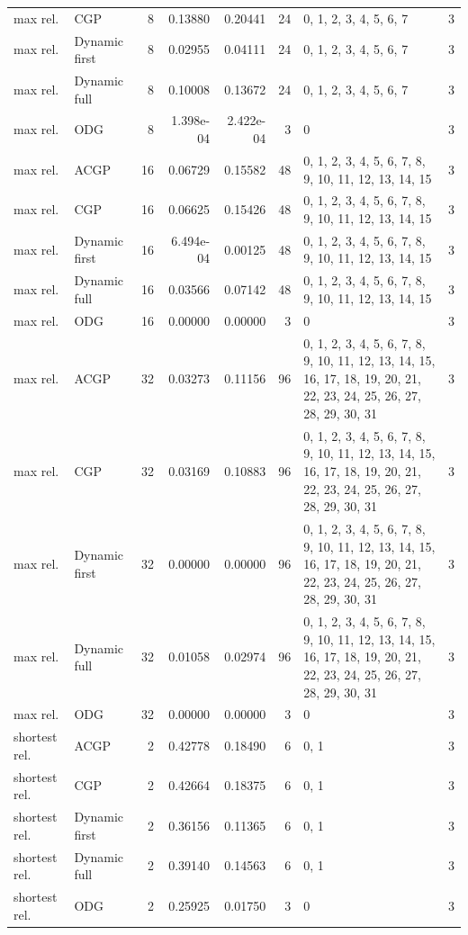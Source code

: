 \documentclass[10pt,a4paper]{article}
\begin{document}
\begin{longtable}{@{}p{23mm}p{29mm}rrrrp{36mm}r@{}}
max rel. & CGP & 8 & 0.13880 & 0.20441 & 24 & 0, 1, 2, 3, 4, 5, 6, 7 & 3 \\
max rel. & Dynamic first & 8 & 0.02955 & 0.04111 & 24 & 0, 1, 2, 3, 4, 5, 6, 7 & 3 \\
max rel. & Dynamic full & 8 & 0.10008 & 0.13672 & 24 & 0, 1, 2, 3, 4, 5, 6, 7 & 3 \\
max rel. & ODG & 8 & 1.398e-04 & 2.422e-04 & 3 & 0 & 3 \\
max rel. & ACGP & 16 & 0.06729 & 0.15582 & 48 & 0, 1, 2, 3, 4, 5, 6, 7, 8, 9, 10, 11, 12, 13, 14, 15 & 3 \\
max rel. & CGP & 16 & 0.06625 & 0.15426 & 48 & 0, 1, 2, 3, 4, 5, 6, 7, 8, 9, 10, 11, 12, 13, 14, 15 & 3 \\
max rel. & Dynamic first & 16 & 6.494e-04 & 0.00125 & 48 & 0, 1, 2, 3, 4, 5, 6, 7, 8, 9, 10, 11, 12, 13, 14, 15 & 3 \\
max rel. & Dynamic full & 16 & 0.03566 & 0.07142 & 48 & 0, 1, 2, 3, 4, 5, 6, 7, 8, 9, 10, 11, 12, 13, 14, 15 & 3 \\
max rel. & ODG & 16 & 0.00000 & 0.00000 & 3 & 0 & 3 \\
max rel. & ACGP & 32 & 0.03273 & 0.11156 & 96 & 0, 1, 2, 3, 4, 5, 6, 7, 8, 9, 10, 11, 12, 13, 14, 15, 16, 17, 18, 19, 20, 21, 22, 23, 24, 25, 26, 27, 28, 29, 30, 31 & 3 \\
max rel. & CGP & 32 & 0.03169 & 0.10883 & 96 & 0, 1, 2, 3, 4, 5, 6, 7, 8, 9, 10, 11, 12, 13, 14, 15, 16, 17, 18, 19, 20, 21, 22, 23, 24, 25, 26, 27, 28, 29, 30, 31 & 3 \\
max rel. & Dynamic first & 32 & 0.00000 & 0.00000 & 96 & 0, 1, 2, 3, 4, 5, 6, 7, 8, 9, 10, 11, 12, 13, 14, 15, 16, 17, 18, 19, 20, 21, 22, 23, 24, 25, 26, 27, 28, 29, 30, 31 & 3 \\
max rel. & Dynamic full & 32 & 0.01058 & 0.02974 & 96 & 0, 1, 2, 3, 4, 5, 6, 7, 8, 9, 10, 11, 12, 13, 14, 15, 16, 17, 18, 19, 20, 21, 22, 23, 24, 25, 26, 27, 28, 29, 30, 31 & 3 \\
max rel. & ODG & 32 & 0.00000 & 0.00000 & 3 & 0 & 3 \\
shortest rel. & ACGP & 2 & 0.42778 & 0.18490 & 6 & 0, 1 & 3 \\
shortest rel. & CGP & 2 & 0.42664 & 0.18375 & 6 & 0, 1 & 3 \\
shortest rel. & Dynamic first & 2 & 0.36156 & 0.11365 & 6 & 0, 1 & 3 \\
shortest rel. & Dynamic full & 2 & 0.39140 & 0.14563 & 6 & 0, 1 & 3 \\
shortest rel. & ODG & 2 & 0.25925 & 0.01750 & 3 & 0 & 3 \\

\end{longtable}
\end{document}
